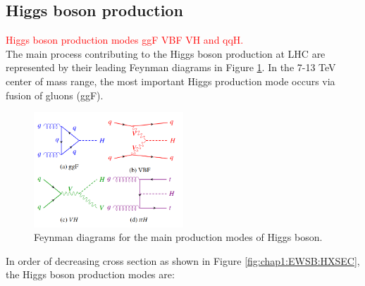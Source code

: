 \subsection{Higgs boson production}
\label{chap1:EWSB:HP}
\textcolor{red}{Higgs boson production modes ggF VBF VH and qqH. \\}
The main process contributing to the Higgs boson production at LHC are represented by their leading Feynman diagrams in Figure \ref{fig:chap1:EWSB:HP}. In the 7-13 TeV center of mass range, the most important Higgs production mode occurs via fusion of gluons (ggF). 
\begin{figure}[H]
    \centering
    \includegraphics[width=0.5\textwidth]{Ch1/Img/Higgs_prod_modes.png}
    \caption{Feynman diagrams for the main production modes of Higgs boson.}
    \label{fig:chap1:EWSB:HP}
\end{figure}
In order of decreasing cross section as shown in Figure \ref{fig:chap1:EWSB:HXSEC}, the Higgs boson production modes are:
